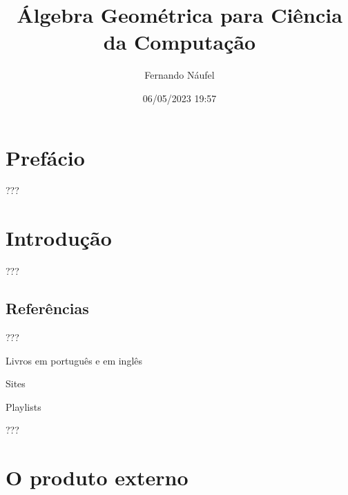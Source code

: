 \documentclass[
  letterpaper,
  DIV=11,
  numbers=noendperiod]{scrreprt}
\title{Álgebra Geométrica para Ciência da Computação}
\author{Fernando Náufel}
\date{06/05/2023 19:57}
\renewcommand*\contentsname{Índice}
\newcommand\contentsname{Índice}
\begin{document}
\maketitle


\ifdefined\Shaded\renewenvironment{Shaded}{\begin{tcolorbox}[frame hidden, borderline west={3pt}{0pt}{shadecolor}, boxrule=0pt, interior hidden, enhanced, sharp corners, breakable]}{\end{tcolorbox}}\fi

\renewcommand*\contentsname{Índice}
{
\hypersetup{linkcolor=}
\setcounter{tocdepth}{2}
\tableofcontents
}
\providecommand{\reais}{\mathbb{R}}
\providecommand{\sen}{\text{sen}\,}
\providecommand{\vet}[1]{\mathbf{#1}}
\providecommand{\ve}[1]{\vet{e}_{#1}}

\hypertarget{prefuxe1cio}{%
\chapter*{Prefácio}\label{prefuxe1cio}}

???

\hypertarget{sec-intro}{%
\chapter{Introdução}\label{sec-intro}}

???

\hypertarget{referuxeancias}{%
\section{Referências}\label{referuxeancias}}

???

Livros em português e em inglês

Sites

Playlists

???

\providecommand{\reais}{\mathbb{R}}
\providecommand{\sen}{\text{sen}\,}
\providecommand{\vet}[1]{\mathbf{#1}}
\providecommand{\ve}[1]{\vet{e}_{#1}}

\hypertarget{sec-prod-ext}{%
\chapter{O produto externo}\label{sec-prod-ext}}
\end{document}
